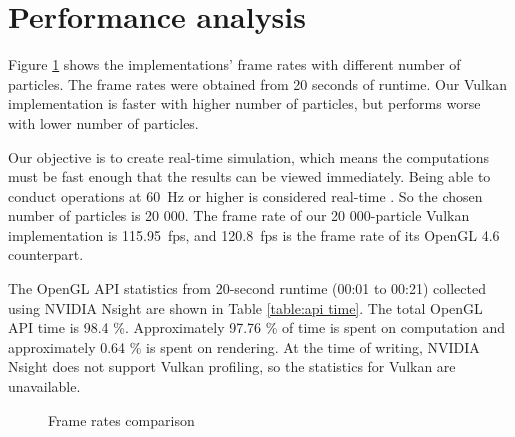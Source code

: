 \documentclass[a4paper, 12pt, oneside]{book}
\begin{document}
\section{Performance analysis}
\begin{doublespace}
    Figure \ref{fig:particles chart} shows the implementations' frame rates with different number of particles. The frame rates were obtained from 20 seconds of runtime. Our Vulkan implementation is faster with higher number of particles, but performs worse with lower number of particles.
    
    Our objective is to create real-time simulation, which means the computations must be fast enough that the results can be viewed immediately. Being able to conduct operations at \SI{60}{\hertz} or higher is considered real-time \cite[438]{marschner2016}. So the chosen number of particles is 20 000. The frame rate of our 20 000-particle Vulkan implementation is \SI{115.95}{fps}, and \SI{120.8}{fps} is the frame rate of its OpenGL 4.6 counterpart. 
    
    The OpenGL API statistics from 20-second runtime (00:01 to 00:21) collected using NVIDIA Nsight are shown in Table \ref{table:api time}. The total OpenGL API time is 98.4 \%. Approximately 97.76 \% of time is spent on computation and approximately 0.64 \% is spent on rendering. At the time of writing, NVIDIA Nsight does not support Vulkan profiling, so the statistics for Vulkan are unavailable.
\end{doublespace}

\begin{figure}[H]
    \centering
    \caption{Frame rates comparison}
    \label{fig:particles chart}
\end{figure}
\end{document}
